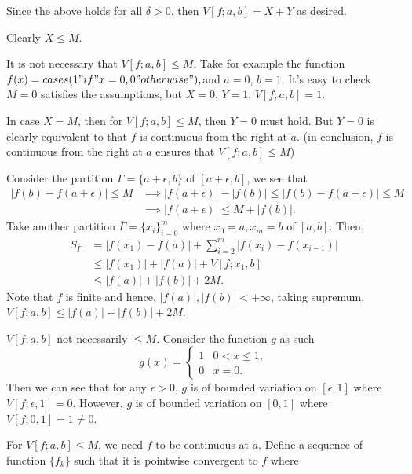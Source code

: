 \documentclass{article}
\begin{document}
Since the above holds for all $δ>0$, then $V[f; a, b]=X+Y$ as desired.

Clearly $X ≤ M$.

It is not necessary that $V[f; a, b] ≤ M$. Take for example the function $ f(x)=cases(1" if "x=0, 0" otherwise"), $and $a=0$, $b=1$. It's easy to check $M=0$ satisfies the assumptions, but $X=0$, $Y=1$, $V[f; a, b]=1$.

In case $X=M$, then for $V[f; a, b] ≤ M$, then $Y=0$ must hold. But $Y=0$ is clearly equivalent to that $f$ is continuous from the right at $a$. (in conclusion, $f$ is continuous from the right at $a$ ensures that $V[f; a, b] ≤ M$)
\typstmathinputdisable{\$}




\iffalse
Consider the partition $\Gamma=\{a+\epsilon,b\}$ of $[a+\epsilon,b]$, we see that 
\begin{align*}
    |f(b)-f(a+\epsilon)|\leq M &\implies |f(a+\epsilon)|-|f(b)|\leq |f(b)-f(a+\epsilon)|\leq M\\
                               &\implies |f(a+\epsilon)|\leq M+|f(b)|.
\end{align*}
Take another partition $\overline{\Gamma}=\{x_{i}\}_{i=0}^{m}$ where $x_{0}=a,x_{m}=b$ of $[a,b]$. Then,
\begin{align*}
    S_{\overline{\Gamma}}&=|f(x_{1})-f(a)|+\sum_{i=2}^{m}|f(x_{i})-f(x_{i-1})| \\
    &\leq |f(x_{1})|+|f(a)|+V[f;x_{1},b] \\ %
    &\leq |f(a)|+|f(b)|+2M.
\end{align*}
Note that $f$ is finite and hence, $|f(a)|, |f(b)|<+\infty$, taking supremum, $V[f;a,b]\leq |f(a)|+|f(b)|+2M$.

$V[f;a,b]$ not necessarily $\leq M$. Consider the function $g$ as such
\[
g(x)=\begin{cases}
    1 & 0<x\leq 1, \\
    0 & x=0.
\end{cases}
\]
Then we can see that for any $\epsilon>0$, $g$ is of bounded variation on $[\epsilon,1]$ where $V[f;\epsilon,1]=0$. However, $g$ is of bounded variation on $[0,1]$ where $V[f;0,1]=1\neq 0$.  

For $V[f;a,b]\leq M$, we need $f$ to be continuous at $a$. Define a sequence of function $\{f_{k}\}$ such that it is pointwise convergent to $f$ where
\end{document}
